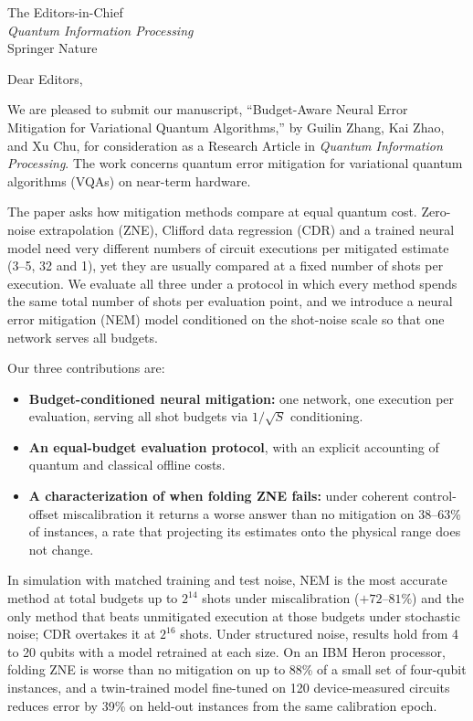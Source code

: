 \documentclass[11pt]{letter}
\date{}
\begin{document}
\begin{letter}{The Editors-in-Chief\\ \textit{Quantum Information Processing}\\ Springer Nature}

\opening{Dear Editors,}

We are pleased to submit our manuscript, ``Budget-Aware Neural Error Mitigation for Variational Quantum Algorithms,'' by Guilin Zhang, Kai Zhao, and Xu Chu, for consideration as a Research Article in \textit{Quantum Information Processing}. The work concerns quantum error mitigation for variational quantum algorithms (VQAs) on near-term hardware.

The paper asks how mitigation methods compare at equal quantum cost. Zero-noise extrapolation (ZNE), Clifford data regression (CDR) and a trained neural model need very different numbers of circuit executions per mitigated estimate (3--5, 32 and 1), yet they are usually compared at a fixed number of shots per execution. We evaluate all three under a protocol in which every method spends the same total number of shots per evaluation point, and we introduce a neural error mitigation (NEM) model conditioned on the shot-noise scale so that one network serves all budgets.

Our three contributions are:
\begin{itemize}[leftmargin=*,topsep=2pt,itemsep=2pt]
  \item \textbf{Budget-conditioned neural mitigation:} one network, one execution per evaluation, serving all shot budgets via $1/\sqrt{S}$ conditioning.
  \item \textbf{An equal-budget evaluation protocol}, with an explicit accounting of quantum and classical offline costs.
  \item \textbf{A characterization of when folding ZNE fails:} under coherent control-offset miscalibration it returns a worse answer than no mitigation on 38--63\% of instances, a rate that projecting its estimates onto the physical range does not change.
\end{itemize}

In simulation with matched training and test noise, NEM is the most accurate method at total budgets up to $2^{14}$ shots under miscalibration ($+72$--$81\%$) and the only method that beats unmitigated execution at those budgets under stochastic noise; CDR overtakes it at $2^{16}$ shots. Under structured noise, results hold from 4 to 20 qubits with a model retrained at each size. On an IBM Heron processor, folding ZNE is worse than no mitigation on up to 88\% of a small set of four-qubit instances, and a twin-trained model fine-tuned on 120 device-measured circuits reduces error by 39\% on held-out instances from the same calibration epoch.


\end{letter}
\end{document}
